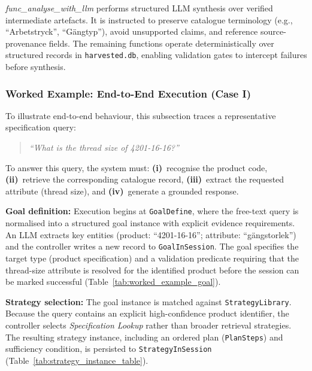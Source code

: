 \documentclass[largeformat]{interact}
\begin{document}
\textit{func\_analyse\_with\_llm} performs structured LLM synthesis over verified intermediate artefacts. It is instructed to preserve catalogue terminology (e.g., ``Arbetstryck'', ``G\"angtyp''), avoid unsupported claims, and reference source-provenance fields. The remaining functions operate deterministically over structured records in \texttt{harvested.db}, enabling validation gates to intercept failures before synthesis.

\subsubsection{Worked Example: End-to-End Execution (Case I)}
\label{subsubsec:worked_example_case_I}
To illustrate end-to-end behaviour, this subsection traces a representative specification query:
\begin{quote}
    \emph{``What is the thread size of 4201-16-16?''}
\end{quote}

\noindent To answer this query, the system must: \textbf{(i)}~recognise the product code, \textbf{(ii)}~retrieve the corresponding catalogue record, \textbf{(iii)}~extract the requested attribute (thread size), and \textbf{(iv)}~generate a grounded response.
\vspace{1em}

\noindent \textbf{Goal definition:}
Execution begins at \texttt{GoalDefine}, where the free-text query is normalised into a structured goal instance with explicit evidence requirements. An LLM extracts key entities (product: ``4201-16-16''; attribute: ``g\"angstorlek'') and the controller writes a new record to \texttt{GoalInSession}. The goal specifies the target type (product specification) and a validation predicate requiring that the thread-size attribute is resolved for the identified product before the session can be marked successful (Table~\ref{tab:worked_example_goal}).

\noindent \textbf{Strategy selection:}
The goal instance is matched against \texttt{StrategyLibrary}. Because the query contains an explicit high-confidence product identifier, the controller selects \textit{Specification Lookup} rather than broader retrieval strategies. The resulting strategy instance, including an ordered plan (\texttt{PlanSteps}) and sufficiency condition, is persisted to \texttt{StrategyInSession} (Table~\ref{tab:strategy_instance_table}).
\end{document}
